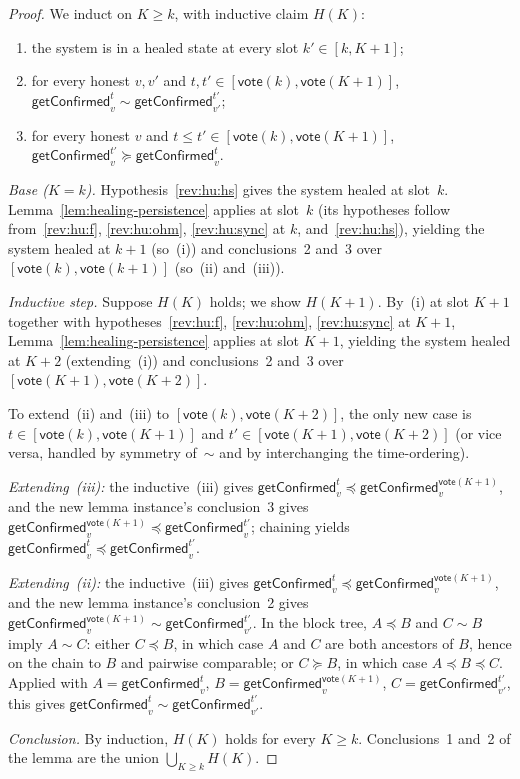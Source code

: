 \ifx\litemode\undefined\documentclass{article}\fi
\newcommand{\vote}{\ensuremath{\mathsf{vote}}}
\newcommand{\getConfirmed}{\textsf{getConfirmed}\xspace}
\theoremstyle{plain}
\theoremstyle{definition}
\theoremstyle{remark}
\begin{document}
\begin{proof}
We induct on $K \geq k$, with inductive claim $H(K)$:
\begin{enumerate}
  \item the system is in a healed state at every slot $k' \in [k, K{+}1]$;
  \item for every honest $v, v'$ and $t, t' \in [\vote(k), \vote(K{+}1)]$, $\getConfirmed_v^t \sim \getConfirmed_{v'}^{t'}$;
  \item for every honest $v$ and $t \leq t' \in [\vote(k), \vote(K{+}1)]$, $\getConfirmed_v^{t'} \succeq \getConfirmed_v^t$.
\end{enumerate}

\emph{Base ($K = k$).}
Hypothesis~\ref{rev:hu:hs} gives the system healed at slot~$k$.
Lemma~\ref{lem:healing-persistence} applies at slot~$k$ (its hypotheses follow from~\ref{rev:hu:f}, \ref{rev:hu:ohm}, \ref{rev:hu:sync} at $k$, and~\ref{rev:hu:hs}), yielding the system healed at $k+1$ (so~(i)) and conclusions~2 and~3 over $[\vote(k), \vote(k{+}1)]$ (so~(ii) and~(iii)).

\emph{Inductive step.}
Suppose $H(K)$ holds; we show $H(K{+}1)$.
By~(i) at slot $K{+}1$ together with hypotheses~\ref{rev:hu:f}, \ref{rev:hu:ohm}, \ref{rev:hu:sync} at $K{+}1$, Lemma~\ref{lem:healing-persistence} applies at slot $K{+}1$, yielding the system healed at $K{+}2$ (extending~(i)) and conclusions~2 and~3 over $[\vote(K{+}1), \vote(K{+}2)]$.

To extend~(ii) and~(iii) to $[\vote(k), \vote(K{+}2)]$, the only new case is $t \in [\vote(k), \vote(K{+}1)]$ and $t' \in [\vote(K{+}1), \vote(K{+}2)]$ (or vice versa, handled by symmetry of~$\sim$ and by interchanging the time-ordering).

\emph{Extending~(iii):}
the inductive~(iii) gives $\getConfirmed_v^t \preceq \getConfirmed_v^{\vote(K{+}1)}$, and the new lemma instance's conclusion~3 gives $\getConfirmed_v^{\vote(K{+}1)} \preceq \getConfirmed_v^{t'}$;
chaining yields $\getConfirmed_v^t \preceq \getConfirmed_v^{t'}$.

\emph{Extending~(ii):}
the inductive~(iii) gives $\getConfirmed_v^t \preceq \getConfirmed_v^{\vote(K{+}1)}$, and the new lemma instance's conclusion~2 gives $\getConfirmed_v^{\vote(K{+}1)} \sim \getConfirmed_{v'}^{t'}$.
In the block tree, $A \preceq B$ and $C \sim B$ imply $A \sim C$:
either $C \preceq B$, in which case $A$ and $C$ are both ancestors of $B$, hence on the chain to $B$ and pairwise comparable;
or $C \succeq B$, in which case $A \preceq B \preceq C$.
Applied with $A = \getConfirmed_v^t$, $B = \getConfirmed_v^{\vote(K{+}1)}$, $C = \getConfirmed_{v'}^{t'}$, this gives $\getConfirmed_v^t \sim \getConfirmed_{v'}^{t'}$.

\emph{Conclusion.}
By induction, $H(K)$ holds for every $K \geq k$. Conclusions~1 and~2 of the lemma are the union $\bigcup_{K \geq k} H(K)$.
\end{proof}
\end{document}
